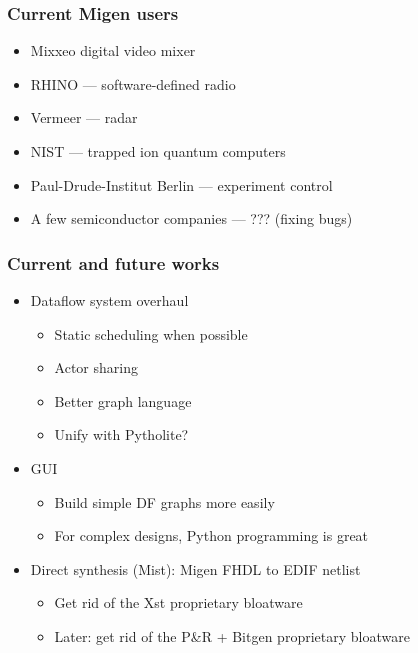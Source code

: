 \documentclass{beamer}
\newcommand\bgoff{\setbeamertemplate{background}{}}
\begin{document}
\begin{frame}
\frametitle{Current Migen users}
\begin{itemize}
\item Mixxeo digital video mixer
\item RHINO --- software-defined radio
\item Vermeer --- radar
\item NIST --- trapped ion quantum computers
\item Paul-Drude-Institut Berlin --- experiment control
\item A few semiconductor companies --- ??? (fixing bugs)
\end{itemize}
\end{frame}

\begin{frame}
\frametitle{Current and future works}
\begin{itemize}
\item Dataflow system overhaul
\begin{itemize}
\item Static scheduling when possible
\item Actor sharing
\item Better graph language
\item Unify with Pytholite?
\end{itemize}
\item GUI
\begin{itemize}
\item Build simple DF graphs more easily
\item For complex designs, Python programming is great
\end{itemize}
\item Direct synthesis (Mist): Migen FHDL to EDIF netlist
\begin{itemize}
\item Get rid of the Xst proprietary bloatware
\item Later: get rid of the P\&R + Bitgen proprietary bloatware
\end{itemize}
\end{itemize}
\end{frame}

\bgoff
\end{document}
